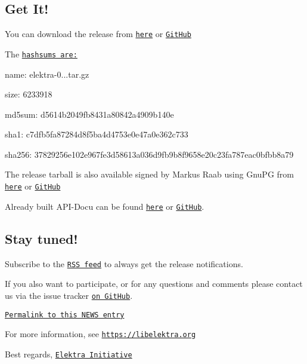 \subsection*{Get It!}

You can download the release from \href{https://www.libelektra.org/ftp/elektra/releases/elektra-0.8.25.tar.gz}{\tt here} or \href{https://github.com/ElektraInitiative/ftp/blob/master/releases/elektra-0.8.25.tar.gz?raw=true}{\tt Git\+Hub}

The \href{https://github.com/ElektraInitiative/ftp/blob/master/releases/elektra-0.8.25.tar.gz.hashsum?raw=true}{\tt hashsums are\+:}


\begin{DoxyItemize}
\item name\+: elektra-\/0...\+tar.\+gz
\item size\+: 6233918
\item md5sum\+: d5614b2049fb8431a80842a4909b140e
\item sha1\+: c7dfb5fa87284d8f5ba4d4753e0e47a0e362c733
\item sha256\+: 37829256e102e967fe3d58613a036d9fb9b8f9658e20c23fa787eac0bfbb8a79
\end{DoxyItemize}

The release tarball is also available signed by Markus Raab using Gnu\+PG from \href{https://www.libelektra.org/ftp/elektra/releases/elektra-0.8.25.tar.gz.gpg}{\tt here} or \href{https://github.com/ElektraInitiative/ftp/blob/master/releases//elektra-0.8.25.tar.gz.gpg?raw=true}{\tt Git\+Hub}

Already built A\+P\+I-\/\+Docu can be found \href{https://doc.libelektra.org/api/0.8.25/html/}{\tt here} or \href{https://github.com/ElektraInitiative/doc/tree/master/api/0.8.25}{\tt Git\+Hub}.

\subsection*{Stay tuned!}

Subscribe to the \href{https://www.libelektra.org/news/feed.rss}{\tt R\+SS feed} to always get the release notifications.

If you also want to participate, or for any questions and comments please contact us via the issue tracker \href{http://issues.libelektra.org}{\tt on Git\+Hub}.

\href{https://www.libelektra.org/news/0.8.25-release}{\tt Permalink to this N\+E\+WS entry}

For more information, see \href{https://libelektra.org}{\tt https\+://libelektra.\+org}

Best regards, \href{https://www.libelektra.org/developers/authors}{\tt Elektra Initiative} 